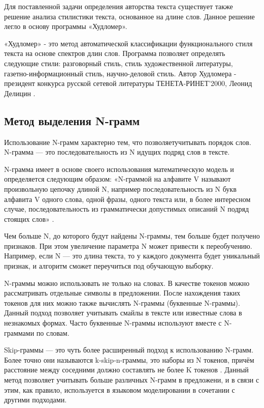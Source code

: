 Для поставленной задачи определения авторства текста существует также решение анализа стилистики текста, основанное на длине слов. Данное решение легло в основу программы «Худломер».

«Худломер» - это метод автоматической классификации функционального стиля текста на основе спектров длин слов. Программа позволяет определять следующие стили: разговорный стиль, стиль художественной литературы, газетно-информационный стиль, научно-деловой стиль. Автор Худломера - президент конкурса русской сетевой литературы ТЕНЕТА-РИНЕТ'2000, Леонид Делицин \cite{hoodlomer}.

\subsection{Метод выделения N-грамм}

Использование N-грамм характерно тем, что позволяетучитывать порядок слов. N-грамма — это последовательность из N идущих подряд слов в тексте.

N-грамма имеет в основе своего использования математическую модель и определяется следующим образом: «N-граммой на алфавите V называют произвольную цепочку длиной N, например последовательность из N букв алфавита V одного слова, одной фразы, одного текста или, в более интересном случае, последовательность из грамматически допустимых описаний N подряд стоящих слов» \cite{ngrams}.

Чем больше N, до которого будут найдены N-граммы, тем больше будет получено признаков. При этом увеличение параметра N может привести к переобучению. Например, если N — это длина текста, то у каждого документа будет уникальный признак, и алгоритм сможет переучиться под обучающую выборку.

N-граммы можно использовать не только на словах. В качестве токенов можно рассматривать отдельные символы в предложении. После нахождения таких токенов для них можно также вычислять N-граммы (буквенные N-граммы). Данный подход позволяет учитывать смайлы в тексте или известные слова в незнакомых формах. Часто буквенные N-граммы используют вместе с N-граммами по словам.

Skip-граммы — это чуть более расширенный подход к использованию N-грамм. Более точно они называются k-skip-n-граммы, это наборы из N токенов, причём расстояние между соседними должно составлять не более K токенов \cite{skipgrams}. Данный метод позволяет учитывать больше различных N-грамм в предложени, и в связи с этим, как правило, используется в языковом моделировании в сочетании с другими подходами. 


